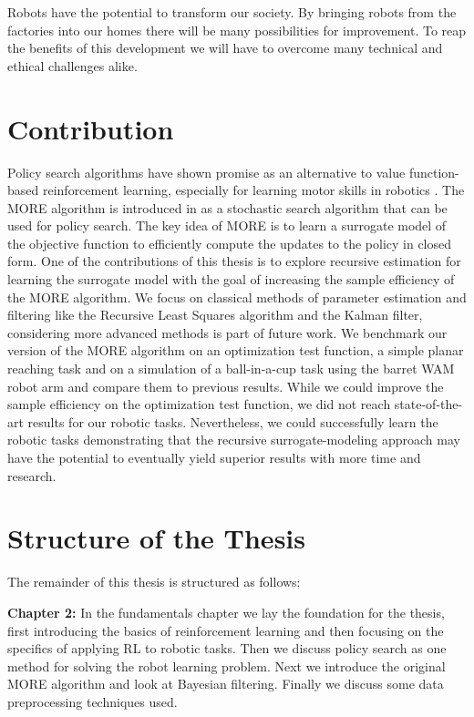 Robots have the potential to transform our society. By
bringing robots from the factories into our homes there will be many
possibilities for improvement. To reap the benefits of this
development we will have to overcome many technical and
ethical challenges alike.



\section{Contribution}
Policy search algorithms have shown promise as an alternative
to value function-based reinforcement learning, especially for learning motor
skills in robotics \citep{deisenroth2013survey}.
The MORE algorithm is introduced in
\citet{abdolmaleki2015model} as a stochastic search algorithm that
can be used for policy search.
The key idea of MORE is to learn a surrogate model of
the objective function to efficiently compute the updates to
the policy in closed form. One of
the contributions of this thesis is to explore recursive estimation 
for learning the surrogate model
with the goal of increasing the sample efficiency of the MORE algorithm.
We focus on classical methods of parameter estimation and filtering
like the Recursive Least Squares algorithm and the Kalman filter,
considering more advanced methods is part of future work.
We benchmark our version of the MORE algorithm on an optimization test
function, a simple planar reaching task and on a simulation
of a ball-in-a-cup task using the barret WAM robot arm
and compare them to previous results. While we could improve the
sample efficiency on the optimization test function, we
did not reach state-of-the-art results for our robotic tasks.
Nevertheless, we could successfully learn the robotic tasks demonstrating
that the recursive surrogate-modeling approach may have the potential to
eventually yield superior results with more time and research.


\section{Structure of the Thesis}
The remainder of this thesis is structured as follows:

\textbf{Chapter 2:} In the fundamentals chapter we lay the foundation for
the thesis, first introducing the basics of reinforcement learning and
then focusing on the specifics of applying RL to robotic tasks.
Then we discuss policy search as one method for
solving the robot learning problem.
Next we introduce the original MORE algorithm and
look at Bayesian filtering. Finally we discuss some data preprocessing
techniques used.

